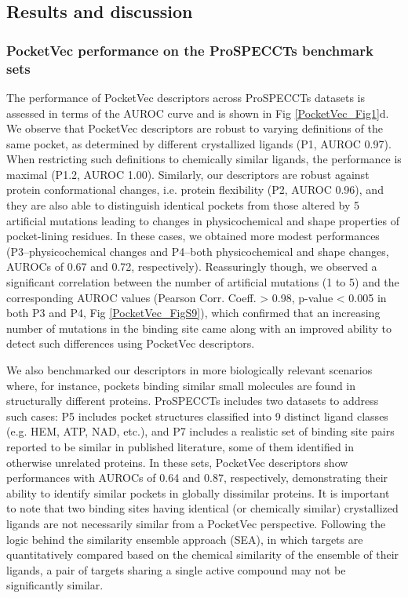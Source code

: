 \subsection{Results and discussion}


\subsubsection{PocketVec performance on the ProSPECCTs benchmark sets}
\label{PocketVec_ResultsAndDiscussion_PocketVec_performance_on_the_ProSPECCTs_benchmark}

The performance of PocketVec descriptors across ProSPECCTs datasets is assessed in terms of the AUROC curve and is shown in Fig \ref{PocketVec_Fig1}d. We observe that PocketVec descriptors are robust to varying definitions of the same pocket, as determined by different crystallized ligands (P1, AUROC 0.97). When restricting such definitions to chemically similar ligands, the performance is maximal (P1.2, AUROC 1.00). Similarly, our descriptors are robust against protein conformational changes, i.e. protein flexibility (P2, AUROC 0.96), and they are also able to distinguish identical pockets from those altered by 5 artificial mutations leading to changes in physicochemical and shape properties of pocket-lining residues. In these cases, we obtained more modest performances (P3--physicochemical changes and P4--both physicochemical and shape changes, AUROCs of 0.67 and 0.72, respectively). Reassuringly though, we observed a significant correlation between the number of artificial mutations (1 to 5) and the corresponding AUROC values (Pearson Corr. Coeff. > 0.98, p-value < 0.005 in both P3 and P4, Fig \ref{PocketVec_FigS9}), which confirmed that an increasing number of mutations in the binding site came along with an improved ability to detect such differences using PocketVec descriptors. 

We also benchmarked our descriptors in more biologically relevant scenarios where, for instance, pockets binding similar small molecules are found in structurally different proteins. ProSPECCTs includes two datasets to address such cases: P5 includes pocket structures classified into 9 distinct ligand classes (e.g. HEM, ATP, NAD, etc.), and P7 includes a realistic set of binding site pairs reported to be similar in published literature, some of them identified in otherwise unrelated proteins. In these sets, PocketVec descriptors show performances with AUROCs of 0.64 and 0.87, respectively, demonstrating their ability to identify similar pockets in globally dissimilar proteins. It is important to note that two binding sites having identical (or chemically similar) crystallized ligands are not necessarily similar from a PocketVec perspective. Following the logic behind the similarity ensemble approach (SEA\cite{keiser_relating_2007}), in which targets are quantitatively compared based on the chemical similarity of the ensemble of their ligands, a pair of targets sharing a single active compound may not be significantly similar.


